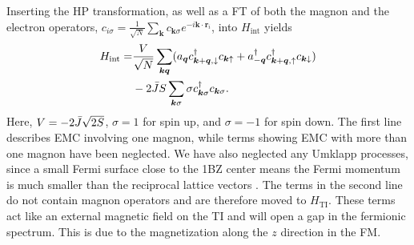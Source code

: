\documentclass[aps, prb, twocolumn,amsmath,amssymb,floatfix]{revtex4-2}
\begin{document}
Inserting the HP transformation, as well as a FT of both the magnon and the electron operators, $c_{i\sigma} = \frac{1}{\sqrt{N}}\sum_{\boldsymbol{k}} c_{\boldsymbol{k}\sigma}e^{-i\boldsymbol{k}\cdot \boldsymbol{r}_i}$, into $H_{\textrm{int}}$ yields
\begin{align}
    H_{\textrm{int}} =& \frac{V}{\sqrt{N}}\sum_{\boldsymbol{k}\boldsymbol{q}} (a_{\boldsymbol{q}}c_{\boldsymbol{k}+\boldsymbol{q}, \downarrow}^\dagger c_{\boldsymbol{k}\uparrow} + a_{-\boldsymbol{q}}^\dagger c_{\boldsymbol{k}+\boldsymbol{q}, \uparrow}^\dagger c_{\boldsymbol{k}\downarrow}) \nonumber \\
    &-2\Bar{J}S\sum_{\boldsymbol{k}\sigma} \sigma c_{\boldsymbol{k}\sigma}^\dagger c_{\boldsymbol{k}\sigma}.
\end{align}
Here, $V = -2\Bar{J}\sqrt{2S}$, $\sigma = 1$ for spin up, and $\sigma = -1$ for spin down. The first line describes EMC involving one magnon, while terms showing EMC with more than one magnon have been neglected. We have also neglected any Umklapp processes, since a small Fermi surface close to the 1BZ center means the Fermi momentum is much smaller than the reciprocal lattice vectors \cite{EirikTIFMAFM}.
The terms in the second line do not contain magnon operators and are therefore moved to $H_{\textrm{TI}}$. 
These terms act like an external magnetic field on the TI and will open a gap in the fermionic spectrum. This is due to the magnetization along the $z$ direction in the FM.
\end{document}
